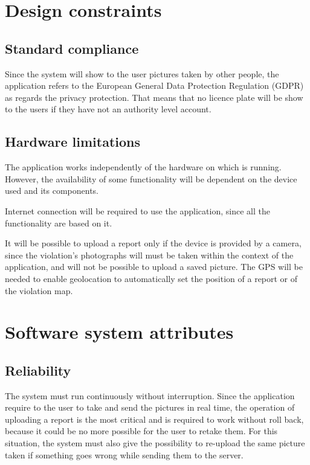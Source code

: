 \documentclass[../RASD.tex]{subfiles}
\begin{document}
        \section{Design constraints}\label{sec:design-constraints}
            \subsection{Standard compliance}\label{subsec:standard-compliance}
            Since the system will show to the user pictures taken by other people, the application refers to the European General Data Protection Regulation (GDPR) as regards the privacy protection. That means that no licence plate will be show to the users if they have not an authority level account.
            \subsection{Hardware limitations}\label{subsec:hardware-limitations}
            The application works independently of the hardware on which is running. However, the availability of some functionality will be dependent on the device used and its components.

            Internet connection will be required to use the application, since all the functionality are based on it.

            It will be possible to upload a report only if the device is provided by a camera, since the violation's photographs will must be taken within the context of the application, and will not be possible to upload a saved picture. The GPS will be needed to enable geolocation to automatically set the position of a report or of the violation map.
    \newpage
        \section{Software system attributes}\label{sec:software-system-attributes}
            \subsection{Reliability}\label{subsec:reliability}
            The system must run continuously without interruption. Since the application require to the user to take and send the pictures in real time, the operation of uploading a report is the most critical and is required to work without roll back, because it could be no more possible for the user to retake them. For this situation, the system must also give the possibility to re-upload the same picture taken if something goes wrong while sending them to the server.
\end{document}
